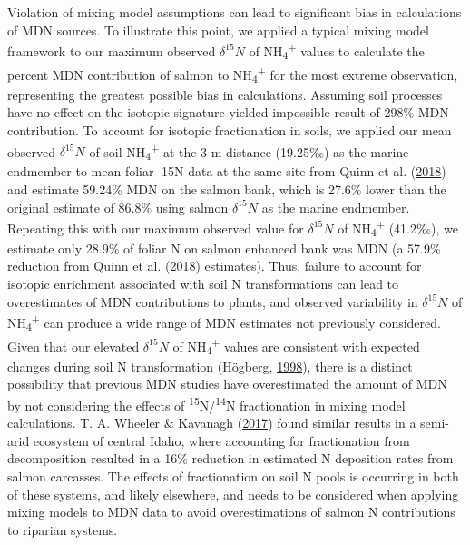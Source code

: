 \documentclass [11pt, proquest] {uwthesis}[2015/03/03]
\begin{document}
Violation of mixing model assumptions can lead to significant bias in
calculations of MDN sources. To illustrate this point, we applied a
typical mixing model framework to our maximum observed \(\delta^{15}N\)
of NH\textsubscript{4}\textsuperscript{+} values to calculate the
percent MDN contribution of salmon to
NH\textsubscript{4}\textsuperscript{+} for the most extreme observation,
representing the greatest possible bias in calculations. Assuming soil
processes have no effect on the isotopic signature yielded impossible
result of 298\% MDN contribution. To account for isotopic fractionation
in soils, we applied our mean observed \(\delta^{15}N\) of soil
NH\textsubscript{4}\textsuperscript{+} at the 3 m distance (19.25‰) as
the marine endmember to mean foliar 15N data at the same site from
Quinn et al. (\protect\hyperlink{ref-Quinn2018}{2018}) and estimate
59.24\% MDN on the salmon bank, which is 27.6\% lower than the original
estimate of 86.8\% using salmon \(\delta^{15}N\) as the marine
endmember. Repeating this with our maximum observed value for
\(\delta^{15}N\) of NH\textsubscript{4}\textsuperscript{+} (41.2‰), we
estimate only 28.9\% of foliar N on salmon enhanced bank was MDN (a
57.9\% reduction from Quinn et al.
(\protect\hyperlink{ref-Quinn2018}{2018}) estimates). Thus, failure to
account for isotopic enrichment associated with soil N transformations
can lead to overestimates of MDN contributions to plants, and observed
variability in \(\delta^{15}N\) of
NH\textsubscript{4}\textsuperscript{+} can produce a wide range of MDN
estimates not previously considered. Given that our elevated
\(\delta^{15}N\) of NH\textsubscript{4}\textsuperscript{+} values are
consistent with expected changes during soil N transformation (Högberg,
\protect\hyperlink{ref-Hogberg1998}{1998}), there is a distinct
possibility that previous MDN studies have overestimated the amount of
MDN by not considering the effects of
\textsuperscript{15}N/\textsuperscript{14}N fractionation in mixing
model calculations. T. A. Wheeler \& Kavanagh
(\protect\hyperlink{ref-Wheeler2017}{2017}) found similar results in a
semi-arid ecosystem of central Idaho, where accounting for fractionation
from decomposition resulted in a 16\% reduction in estimated N
deposition rates from salmon carcasses. The effects of fractionation on
soil N pools is occurring in both of these systems, and likely
elsewhere, and needs to be considered when applying mixing models to MDN
data to avoid overestimations of salmon N contributions to riparian
systems.
\end{document}
